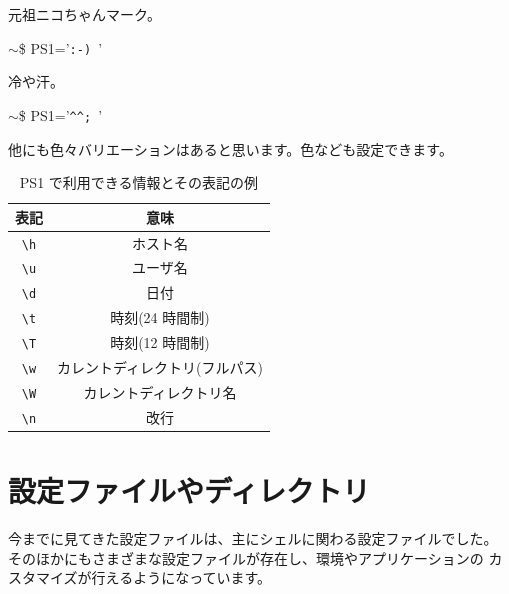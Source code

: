 \documentclass[a4j]{ltjsreport}
\begin{document}
    元祖ニコちゃんマーク。
    \begin{screen}
        $\sim$\$ PS1='\verb+:-) +'
    \end{screen}

    冷や汗。
    \begin{screen}
        $\sim$\$ PS1='\verb+^^; +'
    \end{screen}
    他にも色々バリエーションはあると思います。色なども設定できます。
    \begin{table}[htbp]
        \centering
        \caption{PS1 で利用できる情報とその表記の例}
        \label{tab:ps1}
        \begin{tabular}{cc} \hline\hline
            表記 & 意味 \\ \hline
            \verb+\h+    &  ホスト名  \\
            \verb+\u+    &  ユーザ名  \\
            \verb+\d+    &  日付  \\
            \verb+\t+    &  時刻(24 時間制)  \\
            \verb+\T+    &  時刻(12 時間制)  \\
            \verb+\w+    &  カレントディレクトリ(フルパス)  \\
            \verb+\W+    &  カレントディレクトリ名  \\
            \verb+\n+    &  改行  \\
            \hline\hline
        \end{tabular}
    \end{table}

    \section{設定ファイルやディレクトリ}
    今までに見てきた設定ファイルは、主にシェルに関わる設定ファイルでした。
    そのほかにもさまざまな設定ファイルが存在し、環境やアプリケーションの
    カスタマイズが行えるようになっています。
\end{document}
